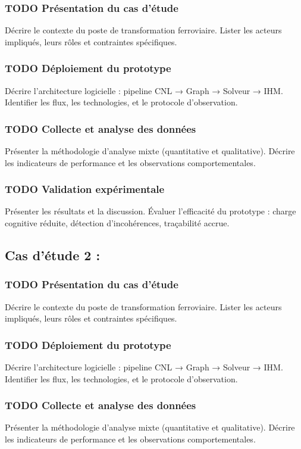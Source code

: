 \documentclass[a4paper,12pt]{article}
\begin{document}
\subsubsection{{\bfseries\sffamily TODO} Présentation du cas d’étude}
\label{sec:org21c2507}
Décrire le contexte du poste de transformation ferroviaire.  
Lister les acteurs impliqués, leurs rôles et contraintes spécifiques.
\subsubsection{{\bfseries\sffamily TODO} Déploiement du prototype}
\label{sec:orge91f575}
Décrire l’architecture logicielle : pipeline CNL → Graph → Solveur → IHM.  
Identifier les flux, les technologies, et le protocole d’observation.
\subsubsection{{\bfseries\sffamily TODO} Collecte et analyse des données}
\label{sec:org1abac4f}
Présenter la méthodologie d’analyse mixte (quantitative et qualitative).  
Décrire les indicateurs de performance et les observations comportementales.
\subsubsection{{\bfseries\sffamily TODO} Validation expérimentale}
\label{sec:org74a9578}
Présenter les résultats et la discussion.  
Évaluer l’efficacité du prototype : charge cognitive réduite, détection d’incohérences, traçabilité accrue.
\subsection{Cas d'étude 2 :}
\label{sec:orga306e39}
\subsubsection{{\bfseries\sffamily TODO} Présentation du cas d’étude}
\label{sec:org84526f9}
Décrire le contexte du poste de transformation ferroviaire.  
Lister les acteurs impliqués, leurs rôles et contraintes spécifiques.
\subsubsection{{\bfseries\sffamily TODO} Déploiement du prototype}
\label{sec:org19906a0}
Décrire l’architecture logicielle : pipeline CNL → Graph → Solveur → IHM.  
Identifier les flux, les technologies, et le protocole d’observation.
\subsubsection{{\bfseries\sffamily TODO} Collecte et analyse des données}
\label{sec:orge10cc0e}
Présenter la méthodologie d’analyse mixte (quantitative et qualitative).  
Décrire les indicateurs de performance et les observations comportementales.
\end{document}
